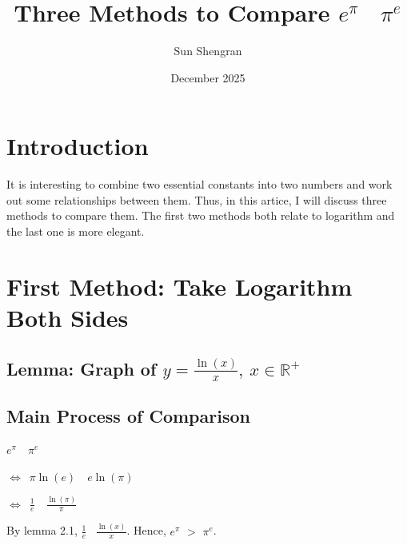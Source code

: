 \documentclass{article}
\title{Three Methods to Compare $e^\pi$ \text{and}\  $\pi^e$}
\author{Sun Shengran}
\date{December 2025}
\begin{document}
  

\maketitle

\section{Introduction}
It is interesting to combine two essential constants into two numbers and work out
some relationships between them. Thus, in this artice, I will discuss three methods to compare them. The first two methods both relate to logarithm and the last one is more elegant.

\section{First Method: Take Logarithm Both Sides}
\subsection{Lemma: Graph of $y = \frac{\ln(x)}{x},\ x\in \mathbb{R}^{+}$}

\begin{figure}[h]
\centering
{}
\end{figure}
\subsection{Main Process of Comparison}

\begin{center}
$e^\pi$\ \ $\pi^e$\

\vspace{0.2cm}
$\Leftrightarrow$\  $\pi \ln(e)$\ \ $e \ln(\pi)$ \\
\vspace{0.1cm}

\vspace{0.2cm}
$\Leftrightarrow$\ $\frac{1}{e}$\ \ $\frac{\ln(\pi)}{\pi}$
\end{center}
By lemma 2.1, $\frac{1}{e}$ \ $\frac{\ln(x)}{x}$.
Hence, $e^\pi$ $>$ $\pi^e$.
\end{document}
